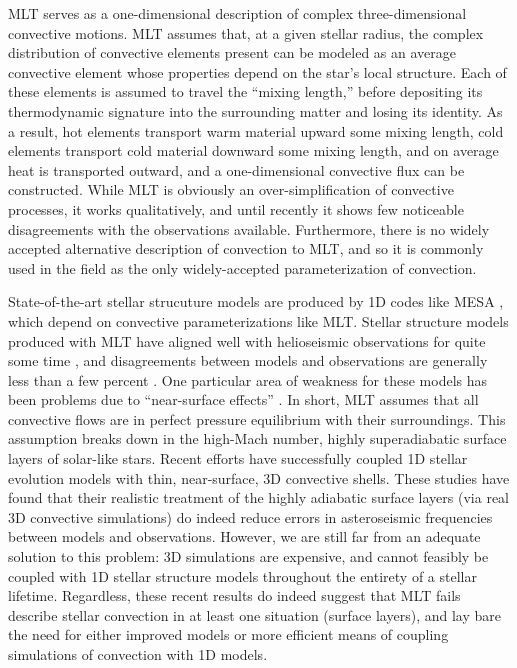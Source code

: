 MLT serves as a one-dimensional description of complex three-dimensional convective motions.
MLT assumes that, at a given stellar radius, the complex distribution of convective elements present can be modeled as an average convective element whose properties depend on the star's local structure.
Each of these elements is assumed to travel the ``mixing length,'' before depositing its thermodynamic signature into the surrounding matter and losing its identity.
As a result, hot elements transport warm material upward some mixing length, cold elements transport cold material downward some mixing length, and on average heat is transported outward, and a one-dimensional convective flux can be constructed.
While MLT is obviously an over-simplification of convective processes, it works qualitatively, and until recently it shows few noticeable disagreements with the observations available.
Furthermore, there is no widely accepted alternative description of convection to MLT, and so it is commonly used in the field as the only widely-accepted parameterization of convection.

State-of-the-art stellar strucuture models are produced by 1D codes like MESA \citep{paxton&all2011}, which depend on convective parameterizations like MLT.
Stellar structure models produced with MLT have aligned well with helioseismic observations for quite some time \citep{christensen-dalsgaard&all1996}, and disagreements between models and observations are generally less than a few percent \citep{serenelli&all2009}.
One particular area of weakness for these models has been problems due to ``near-surface effects'' \citep{kjeldsen&all2008}.
In short, MLT assumes that all convective flows are in perfect pressure equilibrium with their surroundings.
This assumption breaks down in the high-Mach number, highly superadiabatic surface layers of solar-like stars.
Recent efforts \citep{jorgensen&weiss2019, mosumgaard&all2020} have successfully coupled 1D stellar evolution models with thin, near-surface, 3D convective shells.
These studies have found that their realistic treatment of the highly adiabatic surface layers (via real 3D convective simulations) do indeed reduce errors in asteroseismic frequencies between models and observations.
However, we are still far from an adequate solution to this problem: 3D simulations are expensive, and cannot feasibly be coupled with 1D stellar structure models throughout the entirety of a stellar lifetime.
Regardless, these recent results do indeed suggest that MLT fails describe stellar convection in at least one situation (surface layers), and lay bare the need for either improved models or more efficient means of coupling simulations of convection with 1D models.

